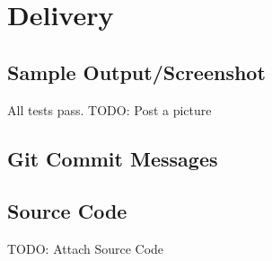 \documentclass{article}
\begin{document}
\section{Delivery}

\subsection{Sample Output/Screenshot}

All tests pass.
TODO: Post a picture
\subsection{Git Commit Messages}

\subsection{Source Code}

TODO: Attach Source Code
\end{document}
